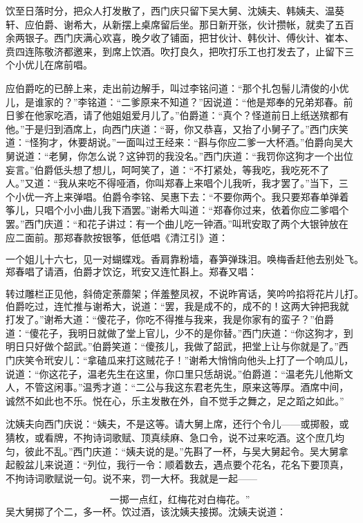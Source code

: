饮至日落时分，把众人打发散了，西门庆只留下吴大舅、沈姨夫、韩姨夫、温葵轩、应伯爵、谢希大，从新摆上桌席留后坐。那日新开张，伙计攒帐，就卖了五百余两银子。西门庆满心欢喜，晚夕收了铺面，把甘伙计、韩伙计、傅伙计、崔本、贲四连陈敬济都邀来，到席上饮酒。吹打良久，把吹打乐工也打发去了，止留下三个小优儿在席前唱。

应伯爵吃的已醉上来，走出前边解手，叫过李铭问道：“那个扎包髻儿清俊的小优儿，是谁家的？”李铭道：“二爹原来不知道？”因说道：“他是郑奉的兄弟郑春。前日爹在他家吃酒，请了他姐姐爱月儿了。”伯爵道：“真个？怪道前日上纸送殡都有他。”于是归到酒席上，向西门庆道：“哥，你又恭喜，又抬了小舅子了。”西门庆笑道：“怪狗才，休要胡说。”一面叫过王经来：“斟与你应二爹一大杯酒。”伯爵向吴大舅说道：“老舅，你怎么说？这钟罚的我没名。”西门庆道：“我罚你这狗才一个出位妄言。”伯爵低头想了想儿，呵呵笑了，道：“不打紧处，等我吃，我吃死不了人。”又道：“我从来吃不得哑酒，你叫郑春上来唱个儿我听，我才罢了。”当下，三个小优一齐上来弹唱。伯爵令李铭、吴惠下去：“不要你两个。我只要郑春单弹着筝儿，只唱个小小曲儿我下酒罢。”谢希大叫道：“郑春你过来，依着你应二爹唱个罢。”西门庆道：“和花子讲过：有一个曲儿吃一钟酒。”叫玳安取了两个大银钟放在应二面前。那郑春款按银筝，低低唱《清江引》道：

\[
一个姐儿十六七，见一对蝴蝶戏。
香肩靠粉墙，春笋弹珠泪。
唤梅香赶他去别处飞。
\]
郑春唱了请酒，伯爵才饮讫，玳安又连忙斟上。郑春又唱：

\[
转过雕栏正见他，斜倚定荼蘼架；
佯羞整凤衩，不说昨宵话，笑吟吟掐将花片儿打。
\]
伯爵吃过，连忙推与谢希大，说道：“罢，我是成不的，成不的！这两大钟把我就打发了。”谢希大道：“傻花子，你吃不得推与我来，我是你家有\textMaoPi 的蛮子？”伯爵道：“傻花子，我明日就做了堂上官儿，少不的是你替。”西门庆道：“你这狗才，到明日只好做个韶武。”伯爵笑道：“傻孩儿，我做了韶武，把堂上让与你就是了。”西门庆笑令玳安儿：“拿磕瓜来打这贼花子！”谢希大悄悄向他头上打了一个响瓜儿，说道：“你这花子，温老先生在这里，你口里只恁胡说。”伯爵道：“温老先儿他斯文人，不管这闲事。”温秀才道：“二公与我这东君老先生，原来这等厚。酒席中间，诚然不如此也不乐。悦在心，乐主发散在外，自不觉手之舞之，足之蹈之如此。”

沈姨夫向西门庆说：“姨夫，不是这等。请大舅上席，还行个令儿——或掷骰，或猜枚，或看牌，不拘诗词歌赋、顶真续麻、急口令，说不过来吃酒。这个庶几均匀，彼此不乱。”西门庆道：“姨夫说的是。”先斟了一杯，与吴大舅起令。吴大舅拿起骰盆儿来说道：“列位，我行一令：顺着数去，遇点要个花名，花名下要顶真，不拘诗词歌赋说一句。说不来，罚一大杯。我就是一起——

\[
一掷一点红，红梅花对白梅花。”
\]
吴大舅掷了个二，多一杯。饮过酒，该沈姨夫接掷。沈姨夫说道：

